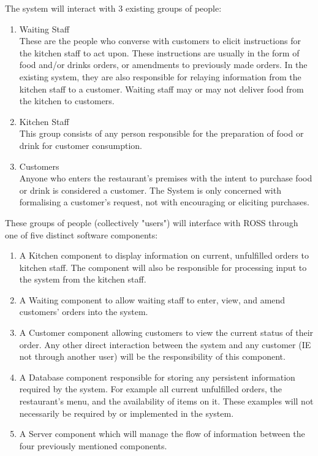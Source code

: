 \documentclass[11pt, a4paper]{report}
\begin{document}
The system will interact with 3 existing groups of people:
\begin{enumerate}
\item Waiting Staff\\
These are the people who converse with customers to elicit instructions for the kitchen staff to act upon. These instructions are usually in the form of food and/or drinks orders, or amendments to previously made orders. In the existing system, they are also responsible for relaying information from the kitchen staff to a customer. Waiting staff may or may not deliver food from the kitchen to customers.
\item Kitchen Staff\\
This group consists of any person responsible for the preparation of food or drink for customer consumption.
\item Customers\\
Anyone who enters the restaurant's premises with the intent to purchase food or drink is considered a customer. The System is only concerned with formalising a customer's request, not with encouraging or eliciting purchases.
\end{enumerate}

\noindent
These groups of people (collectively "users") will interface with ROSS through one of five distinct software components:
\begin{enumerate}
\item A Kitchen component to display information on current, unfulfilled orders to kitchen staff. The component will also be responsible for processing input to the system from the kitchen staff.
\item A Waiting component to allow waiting staff to enter, view, and amend customers' orders into the system.
\item A Customer component allowing customers to view the current status of their order. Any other direct interaction between the system and any customer (IE not through another user) will be the responsibility of this component.
\item A Database component responsible for storing any persistent information required by the system. For example all current unfulfilled orders, the restaurant's menu, and the availability of items on it. These examples will not necessarily be required by or implemented in the system.
\item A Server component which will manage the flow of information between the four previously mentioned components.
\end{enumerate}
\end{document}
